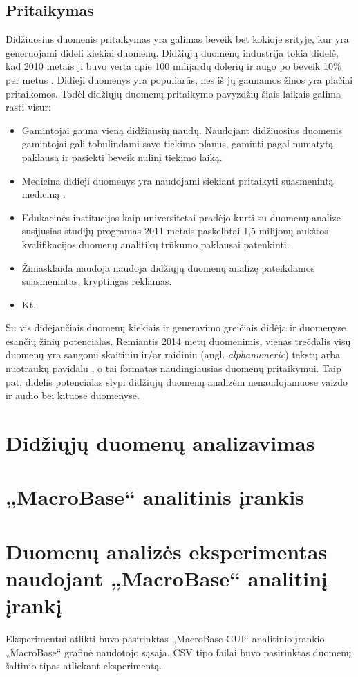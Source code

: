 \documentclass{VUMIFPSkursinis}
\begin{document}
\subsection{Pritaikymas} \label{subsec:pritaikymas}
Didžiuosius duomenis pritaikymas yra galimas beveik bet kokioje srityje, kur yra generuojami dideli kiekiai duomenų. Didžiųjų duomenų industrija tokia didelė, kad 2010 metais ji buvo verta apie 100 milijardų dolerių ir augo po beveik 10\% per metus \cite{bigdata_industry}. Didieji duomenys yra populiarūs, nes iš jų gaunamos žinos yra plačiai pritaikomos. Todėl didžiųjų duomenų pritaikymo pavyzdžių šiais laikais galima rasti visur:
\begin{itemize}
\item Gamintojai gauna vieną didžiausių naudų. Naudojant didžiuosius duomenis gamintojai gali tobulindami savo tiekimo planus, gaminti pagal numatytą paklausą ir pasiekti beveik nulinį tiekimo laiką.
\item Medicina didieji duomenys yra naudojami siekiant pritaikyti suasmenintą mediciną \cite{in_medicine}.
\item Edukacinės institucijos kaip universitetai pradėjo kurti su duomenų analize susijusias studijų programas 2011 metais paskelbtai 1,5 milijonų aukštos kvalifikacijos duomenų analitikų trūkumo \cite{shortage} paklausai patenkinti.
\item Žiniasklaida naudoja naudoja didžiųjų duomenų analizę pateikdamos suasmenintas, kryptingas reklamas.
\item Kt.
\end{itemize}
Su vis didėjančiais duomenų kiekiais ir generavimo greičiais didėja ir duomenyse esančių žinių potencialas. Remiantis 2014 metų duomenimis, vienas trečdalis visų duomenų yra saugomi skaitiniu ir/ar raidiniu (angl. \textit{alphanumeric}) tekstų arba nuotraukų pavidalu \cite{one_third}, o tai formatas naudingiausias duomenų pritaikymui. Taip pat, didelis potencialas slypi didžiųjų duomenų analizėm nenaudojamuose vaizdo ir audio bei kituose duomenyse.

\section{Didžiųjų duomenų analizavimas}


\section{„MacroBase“ analitinis įrankis}


\section{Duomenų analizės eksperimentas naudojant „MacroBase“ analitinį įrankį}
Eksperimentui atlikti buvo pasirinktas „MacroBase GUI“ analitinio įrankio „MacroBase“ grafinė naudotojo sąsaja. CSV tipo failai buvo pasirinktas duomenų šaltinio tipas atliekant eksperimentą.
\end{document}
